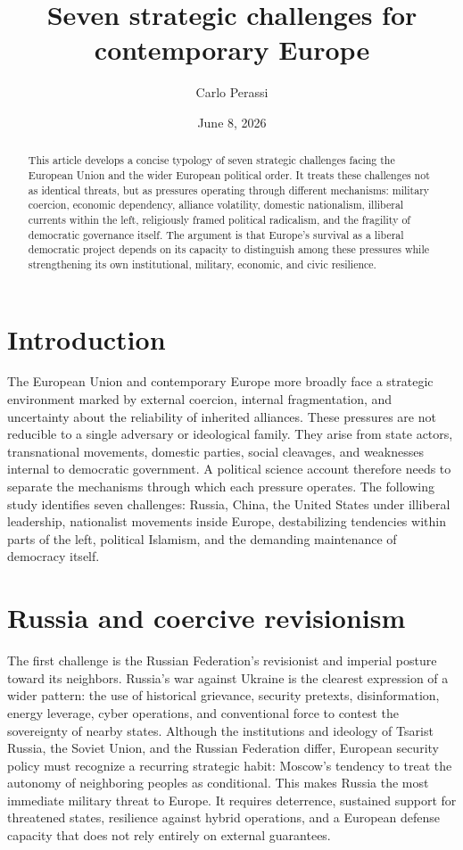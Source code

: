 \documentclass[11pt]{article}
\title{Seven strategic challenges for contemporary Europe}
\author{Carlo Perassi}
\date{June 8, 2026}
\begin{document}
\maketitle

\begin{abstract}
	This article develops a concise typology of seven strategic challenges facing the European Union and the wider European political order. It treats these challenges not as identical threats, but as pressures operating through different mechanisms: military coercion, economic dependency, alliance volatility, domestic nationalism, illiberal currents within the left, religiously framed political radicalism, and the fragility of democratic governance itself. The argument is that Europe's survival as a liberal democratic project depends on its capacity to distinguish among these pressures while strengthening its own institutional, military, economic, and civic resilience.
\end{abstract}

\section{Introduction}

The European Union and contemporary Europe more broadly face a strategic environment marked by external coercion, internal fragmentation, and uncertainty about the reliability of inherited alliances. These pressures are not reducible to a single adversary or ideological family. They arise from state actors, transnational movements, domestic parties, social cleavages, and weaknesses internal to democratic government. A political science account therefore needs to separate the mechanisms through which each pressure operates. The following study identifies seven challenges: Russia, China, the United States under illiberal leadership, nationalist movements inside Europe, destabilizing tendencies within parts of the left, political Islamism, and the demanding maintenance of democracy itself.

\section{Russia and coercive revisionism}

The first challenge is the Russian Federation's revisionist and imperial posture toward its neighbors. Russia's war against Ukraine is the clearest expression of a wider pattern: the use of historical grievance, security pretexts, disinformation, energy leverage, cyber operations, and conventional force to contest the sovereignty of nearby states. Although the institutions and ideology of Tsarist Russia, the Soviet Union, and the Russian Federation differ, European security policy must recognize a recurring strategic habit: Moscow's tendency to treat the autonomy of neighboring peoples as conditional. This makes Russia the most immediate military threat to Europe. It requires deterrence, sustained support for threatened states, resilience against hybrid operations, and a European defense capacity that does not rely entirely on external guarantees.
\end{document}
